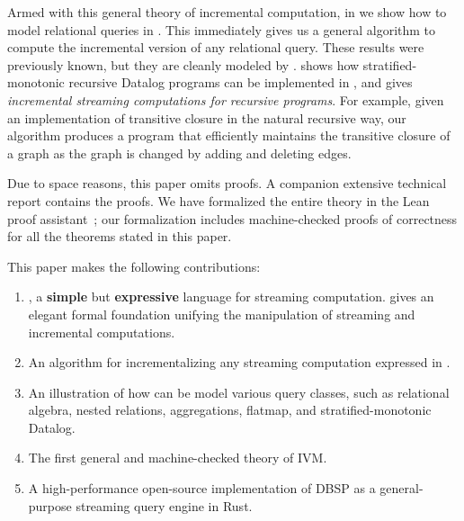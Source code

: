 Armed with this general theory of incremental computation, in
 we show how to model relational queries in
\dbsp.  This immediately gives us a general algorithm to compute the
incremental version of any relational query.  These results were
previously known, but they are cleanly modeled by \dbsp.
 shows how stratified-monotonic recursive Datalog
programs can be implemented in \dbsp, and  gives
\emph{incremental streaming computations for recursive programs}. For
example, given an implementation of transitive closure in the natural
recursive way, our algorithm produces a program that efficiently
maintains the transitive closure of a graph as the graph is changed by
adding and deleting edges.

Due to space reasons, this paper omits proofs.  A companion extensive
technical report contains the proofs.  We have
formalized the entire \dbsp theory in the Lean proof
assistant~; our formalization includes
machine-checked proofs of correctness for all the theorems stated in
this paper.

This paper makes the following contributions:
\begin{enumerate}[nosep, leftmargin=0pt, itemindent=0.5cm, label=\textbf{(\arabic{*})}]
  \item \dbsp, a \textbf{simple} but \textbf{expressive} language for streaming
  computation. \dbsp gives an elegant formal foundation unifying the manipulation of
  streaming and incremental computations.
  \item An algorithm for incrementalizing any streaming computation expressed in
  \dbsp.
  \item An illustration of how \dbsp can be model various query classes, such as relational algebra,
  nested relations, aggregations, flatmap, and stratified-monotonic Datalog.
  \item The first general and machine-checked theory of IVM.
  \item A high-performance open-source implementation of DBSP as a
  general-purpose streaming query engine in Rust.
\end{enumerate}
